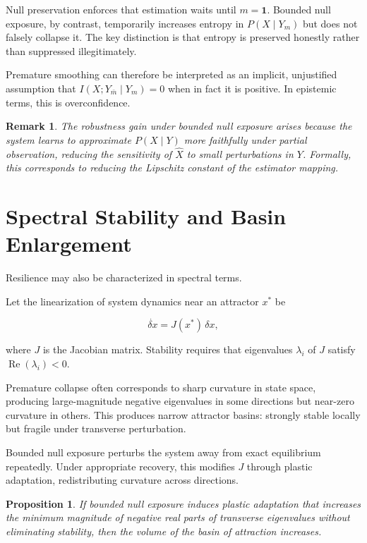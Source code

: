 \documentclass[11pt]{article}
\newtheorem{proposition}{Proposition}
\newtheorem{remark}{Remark}
\theoremstyle{remark}
\begin{document}
Null preservation enforces that estimation waits until $m = \mathbf{1}$. Bounded null exposure, by contrast, temporarily increases entropy in $P(X \mid Y_m)$ but does not falsely collapse it. The key distinction is that entropy is preserved honestly rather than suppressed illegitimately.

Premature smoothing can therefore be interpreted as an implicit, unjustified assumption that $I(X; Y_{\bar m} \mid Y_m) = 0$ when in fact it is positive. In epistemic terms, this is overconfidence.

\begin{remark}
The robustness gain under bounded null exposure arises because the system learns to approximate $P(X \mid Y)$ more faithfully under partial observation, reducing the sensitivity of $\hat{X}$ to small perturbations in $Y$. Formally, this corresponds to reducing the Lipschitz constant of the estimator mapping.
\end{remark}

\section{Spectral Stability and Basin Enlargement}
\label{sec:spectral}

Resilience may also be characterized in spectral terms.

Let the linearization of system dynamics near an attractor $x^*$ be

\[
\dot{\delta x} = J(x^*) \, \delta x,
\]

where $J$ is the Jacobian matrix. Stability requires that eigenvalues $\lambda_i$ of $J$ satisfy $\operatorname{Re}(\lambda_i) < 0$.

Premature collapse often corresponds to sharp curvature in state space, producing large-magnitude negative eigenvalues in some directions but near-zero curvature in others. This produces narrow attractor basins: strongly stable locally but fragile under transverse perturbation.

Bounded null exposure perturbs the system away from exact equilibrium repeatedly. Under appropriate recovery, this modifies $J$ through plastic adaptation, redistributing curvature across directions.

\begin{proposition}
If bounded null exposure induces plastic adaptation that increases the minimum magnitude of negative real parts of transverse eigenvalues without eliminating stability, then the volume of the basin of attraction increases.
\end{proposition}
\end{document}
